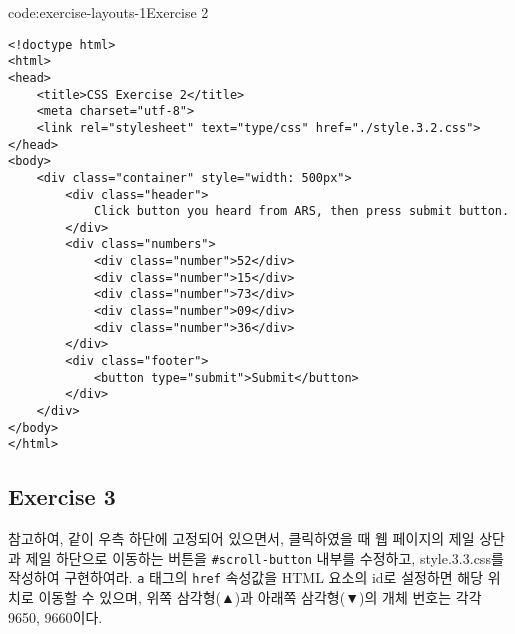 \begin{codeenv}{code:exercise-layouts-1}{Exercise 2}\begin{verbatim}
<!doctype html>
<html>
<head>
    <title>CSS Exercise 2</title>
    <meta charset="utf-8">
    <link rel="stylesheet" text="type/css" href="./style.3.2.css">
</head>
<body>
    <div class="container" style="width: 500px">
        <div class="header">
            Click button you heard from ARS, then press submit button.
        </div>
        <div class="numbers">
            <div class="number">52</div>
            <div class="number">15</div>
            <div class="number">73</div>
            <div class="number">09</div>
            <div class="number">36</div>
        </div>
        <div class="footer">
            <button type="submit">Submit</button>
        </div>
    </div>
</body>
</html>
\end{verbatim}
\end{codeenv}

\subsection*{Exercise 3}

\를 참고하여, \와 같이 우측 하단에 고정되어 있으면서, 클릭하였을 때 웹 페이지의 제일 상단과 제일 하단으로 이동하는 버튼을 \texttt{\#scroll-button} 내부를 수정하고, style.3.3.css를 작성하여 구현하여라. \texttt{a} 태그의 \texttt{href} 속성값을 HTML 요소의 id로 설정하면 해당 위치로 이동할 수 있으며, 위쪽 삼각형(▲)과 아래쪽 삼각형(▼)의 개체 번호는 각각 9650, 9660이다.

    {}

